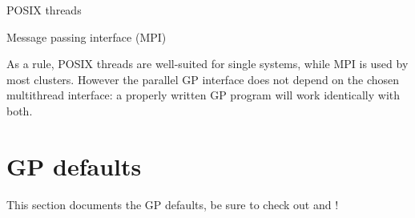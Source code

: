\item POSIX threads

\item Message passing interface (MPI)

As a rule, POSIX threads are well-suited for single systems, while MPI is used
by most clusters. However the parallel GP interface does not depend on the
chosen multithread interface: a properly written GP program will work
identically with both.


\section{GP defaults}
\label{se:gp_defaults} This section documents the GP defaults, be sure to
check out  and  !


\vfill\eject
